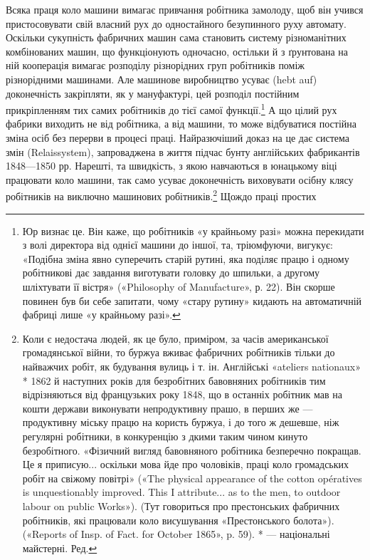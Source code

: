 Всяка праця коло машини вимагає привчання робітника
замолоду, щоб він учився пристосовувати свій власний рух до
одностайного безупинного руху автомату. Оскільки сукупність
фабричних машин сама становить систему різноманітних комбінованих
машин, що функціонують одночасно, остільки й з ґрунтована
на ній кооперація вимагає розподілу різнорідних груп
робітників поміж різнорідними машинами. Але машинове виробництво
усуває (hebt auf) доконечність закріпляти, як у мануфактурі,
цей розподіл постійним прикріпленням тих самих робітників
до тієї самої функції.\footnote{
Юр визнає це. Він каже, що робітників «у крайньому разі» можна
перекидати з волі директора від однієї машини до іншої, та, тріюмфуючи,
вигукує: «Подібна зміна явно суперечить старій рутині, яка поділяє
працю і одному робітникові дає завдання виготувати головку до шпильки,
а другому шліхтувати її вістря» («Philosophy of Manufacture», р. 22).
Він скорше повинен був би себе запитати, чому «стару рутину» кидають
на автоматичній фабриці лише «у крайньому разі».
} А що цілий рух фабрики виходить не від
робітника, а від машини, то може відбуватися постійна зміна
осіб без перерви в процесі праці. Найразючіший доказ на це дає
система змін (Relaissystem), запроваджена в життя підчас бунту
англійських фабрикантів 1848—1850 рр. Нарешті, та швидкість,
з якою навчаються в юнацькому віці працювати коло машини,
так само усуває доконечність виховувати осібну клясу робітників
на виключно машинових робітників.\footnote{
Коли є недостача людей, як це було, приміром, за часів американської
громадянської війни, то буржуа вживає фабричних робітників
тільки до найважчих робіт, як будування вулиць і т. ін. Англійські
«ateliers nationaux» * 1862 й наступних років для безробітних бавовняних
робітників тим відрізняються від французьких року 1848, що в останніх
робітник мав на кошти держави виконувати непродуктивну прашо, в
перших же — продуктивну міську працю на користь буржуа, і до того ж
дешевше, ніж регулярні робітники, в конкуренцію з дкими таким чином
кинуто безробітного. «Фізичний вигляд бавовняного робітника безперечно
покращав. Це я приписую... оскільки мова йде про чоловіків, праці
коло громадських робіт на свіжому повітрі» («The physical appearance
of the cotton opératives is unquestionably improved. This I attribute...
as to the men, to outdoor labour on public Works»). (Тут говориться
про престонських фабричних робітників, які працювали коло висушування
«Престонського болота»). («Reports of Insp. of Fact. for October
1865», p. 59).
* — національні майстерні. Ред.
} Щождо праці простих
\parbreak{}  %
